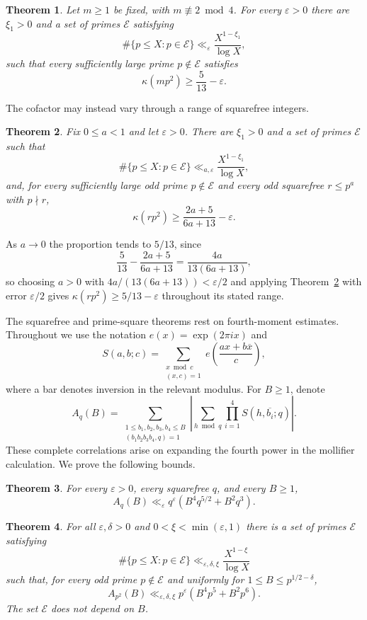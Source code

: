 \documentclass[12pt, a4paper]{amsart}
\numberwithin{equation}{section}
\newcommand{\ep}{\varepsilon}
\renewcommand{\bar}[1]{\overline{#1}}
\renewcommand{\le}{\leqslant}
\renewcommand{\ge}{\geqslant}
\theoremstyle{plain}
\newtheorem{thm}{Theorem}
\begin{document}
\begin{thm}\label{thm:fixed-m-main}
Let $m\ge1$ be fixed, with $m\not\equiv2\bmod4$. For every $\ep>0$ there are $\xi_1>0$ and a set of primes $\mathcal E$ satisfying
$$
\#\{p\le X:p\in\mathcal E\}\ll_\ep\frac{X^{1-\xi_1}}{\log X},
$$
such that every sufficiently large prime $p\notin\mathcal E$ satisfies
$$
\kappa(mp^2)\ge \frac{5}{13}-\ep.
$$
\end{thm}

The cofactor may instead vary through a range of squarefree integers.

\begin{thm}\label{thm:hybrid-interpolation}
Fix $0\le a<1$ and let $\ep>0$. There are $\xi_1>0$ and a set of primes $\mathcal E$ such that
$$
\#\{p\le X:p\in\mathcal E\}\ll_{a,\ep}\frac{X^{1-\xi_1}}{\log X},
$$
and, for every sufficiently large odd prime $p\notin\mathcal E$ and every odd squarefree $r\le p^a$ with $p\nmid r$,
$$
\kappa(rp^2)\ge \frac{2a+5}{6a+13}-\ep.
$$
\end{thm}

As $a\to0$ the proportion tends to $5/13$, since
$$
\frac5{13}-\frac{2a+5}{6a+13}=\frac{4a}{13(6a+13)},
$$
so choosing $a>0$ with $4a/(13(6a+13))<\ep/2$ and applying Theorem~\ref{thm:hybrid-interpolation} with error $\ep/2$ gives $\kappa(rp^2)\ge5/13-\ep$ throughout its stated range.

The squarefree and prime-square theorems rest on fourth-moment estimates. Throughout we use the notation $e(x)=\exp(2\pi ix)$ and
$$
S(a,b;c)=\sum_{\substack{x\bmod c\\(x,c)=1}}
e\left(\frac{ax+b\bar{x}}{c}\right),
$$
where a bar denotes inversion in the relevant modulus. For $B\ge1$, denote
$$
A_q(B)=
\sum_{\substack{1\le b_1,b_2,b_3,b_4\le B\\
(b_1b_2b_3b_4,q)=1}}
\left|
\sum_{h\bmod q}\prod_{i=1}^4S(h,\overline{b_i};q)
\right|.
$$
These complete correlations arise on expanding the fourth power in the mollifier calculation. We prove the following bounds.
\begin{thm}\label{thm:sqfree-average}
For every $\ep>0$, every squarefree $q$, and every $B\ge1$,
$$
A_q(B)\ll_\ep q^\ep(B^4q^{5/2}+B^2q^3).
$$
\end{thm}

\begin{thm}\label{thm:p2-average}
For all $\ep,\delta>0$ and $0<\xi<\min(\ep,1)$ there is a set of primes $\mathcal E$ satisfying
$$
\#\{p\le X:p\in\mathcal E\}\ll_{\ep,\delta,\xi}\frac{X^{1-\xi}}{\log X}
$$
such that, for every odd prime $p\notin\mathcal E$ and uniformly for $1\le B\le p^{1/2-\delta}$,
$$
A_{p^2}(B)\ll_{\ep,\delta,\xi}p^\ep(B^4p^5+B^2p^6).
$$
The set $\mathcal E$ does not depend on $B$.
\end{thm}
\end{document}
